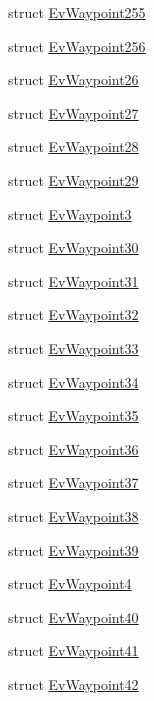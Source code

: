 \begin{DoxyCompactItemize}
\item 
struct \hyperlink{structcl__move__base__z_1_1EvWaypoint255}{Ev\+Waypoint255}
\item 
struct \hyperlink{structcl__move__base__z_1_1EvWaypoint256}{Ev\+Waypoint256}
\item 
struct \hyperlink{structcl__move__base__z_1_1EvWaypoint26}{Ev\+Waypoint26}
\item 
struct \hyperlink{structcl__move__base__z_1_1EvWaypoint27}{Ev\+Waypoint27}
\item 
struct \hyperlink{structcl__move__base__z_1_1EvWaypoint28}{Ev\+Waypoint28}
\item 
struct \hyperlink{structcl__move__base__z_1_1EvWaypoint29}{Ev\+Waypoint29}
\item 
struct \hyperlink{structcl__move__base__z_1_1EvWaypoint3}{Ev\+Waypoint3}
\item 
struct \hyperlink{structcl__move__base__z_1_1EvWaypoint30}{Ev\+Waypoint30}
\item 
struct \hyperlink{structcl__move__base__z_1_1EvWaypoint31}{Ev\+Waypoint31}
\item 
struct \hyperlink{structcl__move__base__z_1_1EvWaypoint32}{Ev\+Waypoint32}
\item 
struct \hyperlink{structcl__move__base__z_1_1EvWaypoint33}{Ev\+Waypoint33}
\item 
struct \hyperlink{structcl__move__base__z_1_1EvWaypoint34}{Ev\+Waypoint34}
\item 
struct \hyperlink{structcl__move__base__z_1_1EvWaypoint35}{Ev\+Waypoint35}
\item 
struct \hyperlink{structcl__move__base__z_1_1EvWaypoint36}{Ev\+Waypoint36}
\item 
struct \hyperlink{structcl__move__base__z_1_1EvWaypoint37}{Ev\+Waypoint37}
\item 
struct \hyperlink{structcl__move__base__z_1_1EvWaypoint38}{Ev\+Waypoint38}
\item 
struct \hyperlink{structcl__move__base__z_1_1EvWaypoint39}{Ev\+Waypoint39}
\item 
struct \hyperlink{structcl__move__base__z_1_1EvWaypoint4}{Ev\+Waypoint4}
\item 
struct \hyperlink{structcl__move__base__z_1_1EvWaypoint40}{Ev\+Waypoint40}
\item 
struct \hyperlink{structcl__move__base__z_1_1EvWaypoint41}{Ev\+Waypoint41}
\item 
struct \hyperlink{structcl__move__base__z_1_1EvWaypoint42}{Ev\+Waypoint42}
\item 

\end{DoxyCompactItemize}

